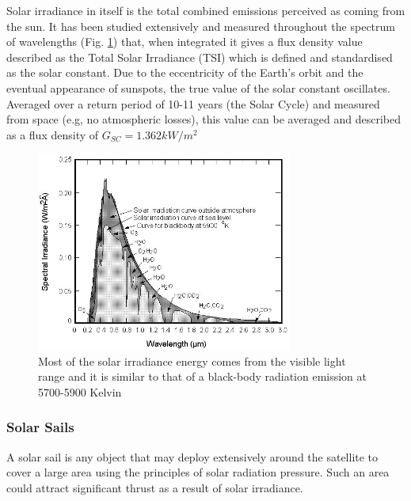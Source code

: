 Solar irradiance in itself is the total combined emissions perceived as coming from the sun. It has been studied extensively and measured throughout the spectrum of wavelengths (Fig. \ref{fig:background_spectrum}) that, when integrated it gives a flux density value described as the Total Solar Irradiance (TSI) which is defined and standardised as the solar constant. Due to the eccentricity of the Earth's orbit and the eventual appearance of sunspots, the true value of the solar constant oscillates. Averaged over a return period of 10-11 years (the Solar Cycle) and measured from space (e.g, no atmospheric losses), this value can be averaged and described as a flux density of $G_{SC} = 1.362 kW/m^2$ \cite{MagneticUniverse}

\begin{figure}[H]
\centering
\includegraphics[width=0.75\textwidth]{images/spectrum.jpg}
\caption{Most of the solar irradiance energy comes from the visible light range and it is similar to that of a black-body radiation emission at 5700-5900 Kelvin \protect\cite{spectrum}}


\label{fig:background_spectrum}
\end{figure}




\subsubsection{Solar Sails}

A solar sail is any object that may deploy extensively around the satellite to cover a large area using the principles of solar radiation pressure. Such an area could attract significant thrust as a result of solar irradiance.

